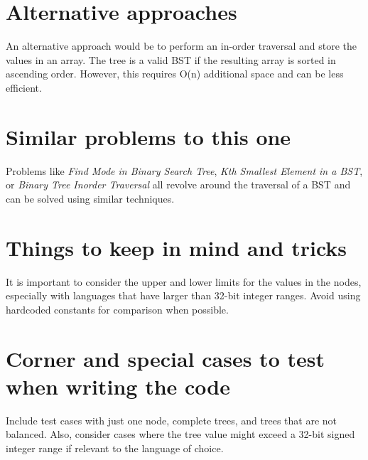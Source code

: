 \section*{Alternative approaches}
An alternative approach would be to perform an in-order traversal and store the values in an array. The tree is a valid BST if the resulting array is sorted in ascending order. However, this requires O(n) additional space and can be less efficient.

\section*{Similar problems to this one}
Problems like \textit{Find Mode in Binary Search Tree}, \textit{Kth Smallest Element in a BST}, or \textit{Binary Tree Inorder Traversal} all revolve around the traversal of a BST and can be solved using similar techniques.

\section*{Things to keep in mind and tricks}
It is important to consider the upper and lower limits for the values in the nodes, especially with languages that have larger than 32-bit integer ranges. Avoid using hardcoded constants for comparison when possible.

\section*{Corner and special cases to test when writing the code}
Include test cases with just one node, complete trees, and trees that are not balanced. Also, consider cases where the tree value might exceed a 32-bit signed integer range if relevant to the language of choice.